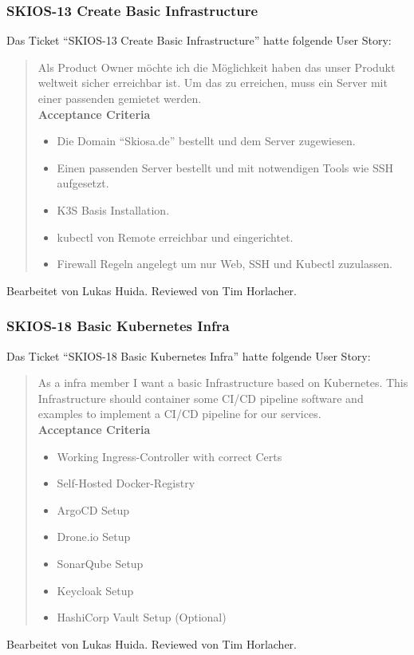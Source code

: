 \subsubsection{SKIOS-13 Create Basic Infrastructure}
Das Ticket \enquote{SKIOS-13 Create Basic Infrastructure} hatte folgende User Story:
\begin{quotation}
    Als Product Owner möchte ich die Möglichkeit haben das unser Produkt weltweit sicher erreichbar ist. Um das zu erreichen, muss ein Server mit einer passenden gemietet werden. \\
    \textbf{Acceptance Criteria}
    \begin{itemize}
        \item Die Domain \enquote{Skiosa.de} bestellt und dem Server zugewiesen.
        \item Einen passenden Server bestellt und mit notwendigen Tools wie SSH aufgesetzt.
        \item K3S Basis Installation.
        \item kubectl von Remote erreichbar und eingerichtet.
        \item Firewall Regeln angelegt um nur Web, SSH und Kubectl zuzulassen.
    \end{itemize} 
\end{quotation}
Bearbeitet von Lukas Huida.
Reviewed von Tim Horlacher.

\subsubsection{SKIOS-18 Basic Kubernetes Infra}
Das Ticket \enquote{SKIOS-18 Basic Kubernetes Infra} hatte folgende User Story:
\begin{quotation}
    As a infra member I want a basic Infrastructure based on Kubernetes. This Infrastructure should container some CI/CD pipeline software and examples to implement
    a CI/CD pipeline for our services. \\
    \textbf{Acceptance Criteria}
    \begin{itemize}
        \item Working Ingress-Controller with correct Certs
        \item Self-Hosted Docker-Registry
        \item ArgoCD Setup
        \item Drone.io Setup
        \item SonarQube Setup
        \item Keycloak Setup
        \item HashiCorp Vault Setup (Optional)
    \end{itemize}
\end{quotation}
Bearbeitet von Lukas Huida.
Reviewed von Tim Horlacher.

